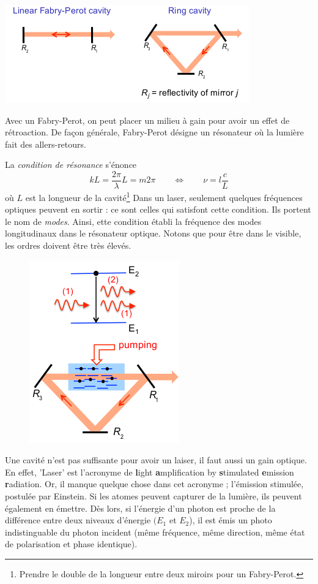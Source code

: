 	
	\begin{center}
	\includegraphics[scale=0.75]{ch1/image3.png}
	\end{center}	
	Avec un Fabry-Perot, on peut placer un milieu à gain pour avoir un effet de rétroaction. De façon 
	générale, Fabry-Perot désigne un résonateur où la lumière fait des allers-retours.
	
	La \textit{condition de résonance} s'énonce
	\begin{equation}
	kL = \frac{2\pi}{\lambda}L = m2\pi\qquad\Leftrightarrow\qquad \nu = l\frac{c}{L}
	\end{equation}
	où $L$ est la longueur de la cavité\footnote{Prendre le double de la longueur entre deux miroirs pour
	un Fabry-Perot.} Dans un laser, seulement quelques fréquences optiques peuvent en sortir : ce sont celles 
	qui satisfont cette condition. Ils portent le nom de \textit{modes}. Ainsi, ette condition établi la 
	fréquence des modes longitudinaux dans le résonateur optique. Notons que pour être dans le visible, les 
	ordres doivent être très élevés.
	
	\newpage	
	\begin{figure}
	\includegraphics[scale=0.65]{ch1/image4.png}
	\end{figure}	
	Une cavité n'est pas suffisante pour avoir un laiser, il faut aussi un gain optique. En effet, 'Laser' est
	l’acronyme de \textbf{l}ight \textbf{a}mplification by \textbf{s}timulated \textbf{e}mission \textbf{r}adiation.
	Or, il manque quelque chose dans cet acronyme ; l’émission stimulée, postulée par Einstein. Si les 
	atomes peuvent capturer de la lumière, ils peuvent également en émettre. Dès lors, si l'énergie d'un photon 
	est proche de la différence entre deux niveaux d'énergie $(E_1$ et $E_2$), il est émis un photo indistinguable 
	du photon incident (même fréquence, même direction, même état de polarisation et phase identique).\\
	
